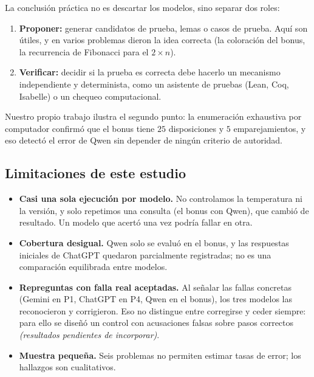 \documentclass[11pt]{article}
\begin{document}
La conclusión práctica no es descartar los modelos, sino separar dos roles:
\begin{enumerate}
\item \textbf{Proponer:} generar candidatos de prueba, lemas o casos de prueba. Aquí son útiles, y en varios problemas dieron la idea correcta (la coloración del bonus, la recurrencia de Fibonacci para el $2\times n$).
\item \textbf{Verificar:} decidir si la prueba es correcta debe hacerlo un mecanismo independiente y determinista, como un asistente de pruebas (Lean, Coq, Isabelle) o un chequeo computacional.
\end{enumerate}

Nuestro propio trabajo ilustra el segundo punto: la enumeración exhaustiva por computador confirmó que el bonus tiene $25$ disposiciones y $5$ emparejamientos, y eso detectó el error de Qwen sin depender de ningún criterio de autoridad.

\subsection{Limitaciones de este estudio}

\begin{itemize}
\item \textbf{Casi una sola ejecución por modelo.} No controlamos la temperatura ni la versión, y solo repetimos una consulta (el bonus con Qwen), que cambió de resultado. Un modelo que acertó una vez podría fallar en otra.
\item \textbf{Cobertura desigual.} Qwen solo se evaluó en el bonus, y las respuestas iniciales de ChatGPT quedaron parcialmente registradas; no es una comparación equilibrada entre modelos.
\item \textbf{Repreguntas con falla real aceptadas.} Al señalar las fallas concretas (Gemini en P1, ChatGPT en P4, Qwen en el bonus), los tres modelos las reconocieron y corrigieron. Eso no distingue entre corregirse y ceder siempre: para ello se diseñó un control con acusaciones falsas sobre pasos correctos \textit{(resultados pendientes de incorporar)}.
\item \textbf{Muestra pequeña.} Seis problemas no permiten estimar tasas de error; los hallazgos son cualitativos.
\end{itemize}
\end{document}

